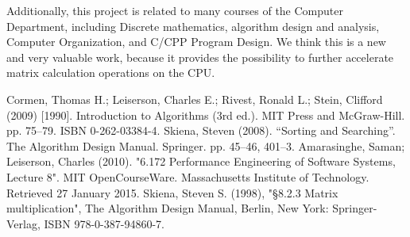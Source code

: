 \documentclass[conference]{IEEEtran}
\begin{document}
	Additionally, this project is related to many courses of the Computer Department, including Discrete mathematics, algorithm design and analysis, Computer Organization, and C/CPP Program Design. We think this is a new and very valuable work, because it provides the possibility to further accelerate matrix calculation operations on the CPU.

	
	\begin{thebibliography}{00}
		 Cormen, Thomas H.; Leiserson, Charles E.; Rivest, Ronald L.; Stein, Clifford (2009) [1990]. Introduction to Algorithms (3rd ed.). MIT Press and McGraw-Hill. pp. 75–79. ISBN 0-262-03384-4.
		  Skiena, Steven (2008). ``Sorting and Searching''. The Algorithm Design Manual. Springer. pp. 45–46, 401–3.
		 Amarasinghe, Saman; Leiserson, Charles (2010). "6.172 Performance Engineering of Software Systems, Lecture 8". MIT OpenCourseWare. Massachusetts Institute of Technology. Retrieved 27 January 2015.
		 Skiena, Steven S. (1998), "§8.2.3 Matrix multiplication", The Algorithm Design Manual, Berlin, New York: Springer-Verlag, ISBN 978-0-387-94860-7.
	\end{thebibliography}
	
\end{document}
